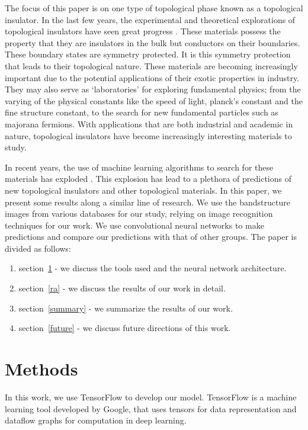 \documentclass[review]{elsarticle}
\begin{document}
The focus of this paper is on one type of topological phase known as a topological insulator. In the last few years, the experimental and theoretical explorations of topological insulators have seen great progress \cite{kou_etal, yan_zhang, ando}. These materials possess the property that they are insulators in the bulk but conductors on their boundaries. These boundary states are symmetry protected. It is this symmetry protection that leads to their topological nature. These materials are becoming increasingly important due to the potential applications of their exotic properties in industry. They may also serve as `laboratories' for exploring fundamental physics; from the varying of the physical constants \cite{joseph_etal} like the speed of light, planck's constant and the fine structure constant, to the search for new fundamental particles such as majorana fermions. With applications that are both industrial and academic in nature, topological insulators have become increasingly interesting materials to study.

In recent years, the use of machine learning algorithms to search for these materials has exploded \cite{zhang_etal, verg_etal, tang_etal}. This explosion has lead to a plethora of predictions of new topological insulators and other topological materials. In this paper, we present some results along a similar line of research. We use the bandstructure images from various databases for our study, relying on image recognition techniques for our work. We use convolutional neural networks to make predictions and compare our predictions with that of other groups. The paper is divided as follows:
\begin{enumerate}
\item section~\ref{methods} - we discuss the tools used and the neural network architecture.
\item section~\ref{ra} - we discuss the results of our work in detail.
\item section~\ref{summary} - we summarize the results of our work.
\item section~\ref{future} - we discuss future directions of this work.
\end{enumerate}

\section{Methods}\label{methods}

In this work, we use TensorFlow to develop our model. TensorFlow is a machine learning tool developed by Google, that uses tensors for data representation and dataflow graphs for computation in deep learning. 
\end{document}
